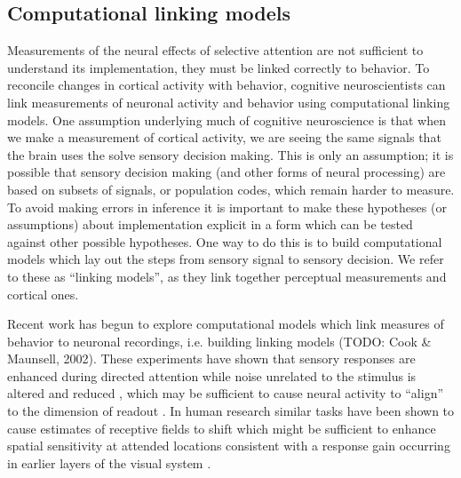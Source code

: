 \subsection{Computational linking models}

Measurements of the neural effects of selective attention are not sufficient to understand its implementation, they must be linked correctly to behavior. To reconcile changes in cortical activity with behavior, cognitive neuroscientists can link measurements of neuronal activity and behavior using computational linking models. One assumption underlying much of cognitive neuroscience is that when we make a measurement of cortical activity, we are seeing the same signals that the brain uses the solve sensory decision making. This is only an assumption; it is possible that sensory decision making (and other forms of neural processing) are based on subsets of signals, or population codes, which remain harder to measure. To avoid making errors in inference it is important to make these hypotheses (or assumptions) about implementation explicit in a form which can be tested against other possible hypotheses. One way to do this is to build computational models which lay out the steps from sensory signal to sensory decision. We refer to these as “linking models”, as they link together perceptual measurements and cortical ones. 

Recent work has begun to explore computational models which link measures of behavior to neuronal recordings, i.e. building linking models \citep{Barlow1972-kz,Brindley1960-gq,Cohen2010-xs,Newsome1989-fr,Pestilli2011-gi} (TODO: Cook & Maunsell, 2002). These experiments have shown that sensory responses are enhanced during directed attention while noise unrelated to the stimulus is altered and reduced \citep{Ecker2016-ro,Rabinowitz2015-uz,Snyder2018-yr}, which may be sufficient to cause neural activity to ``align'' to the dimension of readout \citep{Ruff2018-yx}. In human research similar tasks have been shown to cause estimates of receptive fields to shift \citep{Klein2014-oe} which might be sufficient to enhance spatial sensitivity at attended locations \citep{Klein2016-ox,Vo2017-oi} consistent with a response gain occurring in earlier layers of the visual system \citep{Baruch2014-gy,Miconi2016-ip}.
 

